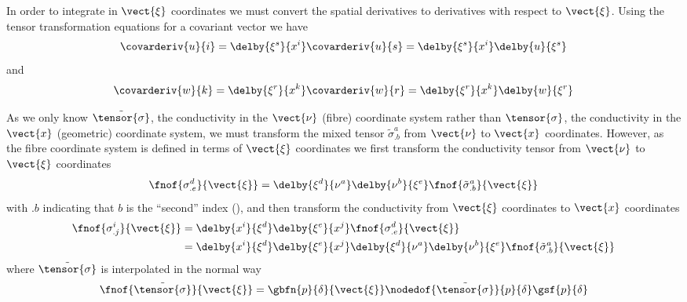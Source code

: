 In order to integrate in $\vect{\xi}$ coordinates we must convert the spatial
derivatives to derivatives with respect to $\vect{\xi}$. Using the tensor
transformation equations for a covariant vector we have
\begin{equation}  
  \covarderiv{u}{i}=\delby{\xi^{s}}{x^{i}}\covarderiv{u}{s}=
  \delby{\xi^{s}}{x^{i}}\delby{u}{\xi^{s}}
\end{equation}
and 
\begin{equation}
  \covarderiv{w}{k}=\delby{\xi^{r}}{x^{k}}\covarderiv{w}{r}=
  \delby{\xi^{r}}{x^{k}}\delby{w}{\xi^{r}}
\end{equation}

As we only know $\tilde{\tensor{\sigma}}$, the conductivity in the 
$\vect{\nu}$ (fibre) coordinate system rather than $\tensor{\sigma}$, the
conductivity in the $\vect{x}$ (geometric) coordinate system, we must transform the mixed
tensor ${\tilde{\sigma}}^{a}_{.b}$ from $\vect{\nu}$ to $\vect{x}$ coordinates. However, as the
fibre coordinate system is defined in terms of $\vect{\xi}$ coordinates we
first transform the conductivity tensor from $\vect{\nu}$ to $\vect{\xi}$
coordinates \ie
\begin{equation}
  \fnof{\sigma^{d}_{.e}}{\vect{\xi}}=\delby{\xi^{d}}{\nu^{a}}\delby{\nu^{b}}{\xi^{e}}
  \fnof{{\tilde{\sigma}}^{a}_{.b}}{\vect{\xi}}
\end{equation}
with $.b$ indicating that $b$ is the ``second'' index (),
and then transform the conductivity from $\vect{\xi}$ coordinates to
$\vect{x}$ coordinates \ie
\begin{equation}
  \begin{split}
    \fnof{\sigma^{i}_{.j}}{\vect{\xi}} &=
    \delby{x^{i}}{\xi^{d}}\delby{\xi^{e}}{x^{j}}
    \fnof{{\sigma}^{d}_{.e}}{\vect{\xi}} \\
    &= \delby{x^{i}}{\xi^{d}}\delby{\xi^{e}}{x^{j}}\delby{\xi^{d}} 
    {\nu^{a}}\delby{\nu^{b}}{\xi^{e}}\fnof{{\tilde{\sigma}}^{a}_{.b}}{\vect{\xi}}
  \end{split}
\end{equation}
where $\tilde{\tensor{\sigma}}$ is interpolated in the normal way \ie
\begin{equation}
  \fnof{\tilde{\tensor{\sigma}}}{\vect{\xi}}
  =\gbfn{p}{\delta}{\vect{\xi}}\nodedof{\tilde{\tensor{\sigma}}}{p}{\delta}
  \gsf{p}{\delta}
\end{equation}

